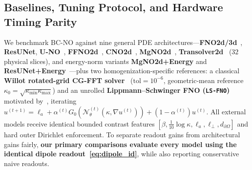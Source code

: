 \documentclass[preprint,11pt]{elsarticle}
\begin{document}
\subsection{Baselines, Tuning Protocol, and Hardware Timing Parity}
We benchmark BC-NO against nine general PDE architectures—\textbf{FNO2d/3d}~\cite{li2021fno}, \textbf{ResUNet}, \textbf{U-NO}~\cite{rahman2023uno}, \textbf{FFNO2d}~\cite{tran2023ffno}, \textbf{CNO2d}~\cite{raonic2023cno}, \textbf{MgNO2d}~\cite{he2024mgno}, \textbf{Transolver2d}~\cite{wu2024transolver} ($32$ physical slices), and energy-norm variants \textbf{MgNO2d+Energy} and \textbf{ResUNet+Energy}~\cite{xing2025cgins}—plus two homogenization-specific references: a classical \textbf{Willot rotated-grid CG-FFT solver}~\cite{willot2015fourier,zeman2010accelerating} ($\mathrm{tol}=10^{-6}$, geometric-mean reference $\kappa_0 = \sqrt{\kappa_{\min}\kappa_{\max}}$) and an unrolled \textbf{Lippmann--Schwinger FNO (\texttt{LS-FNO})} motivated by~\cite{nguyen2026ufno}, iterating $u^{(t+1)} = \ell_a + \alpha^{(t)} G_0(\mathcal{N}_\theta^{(t)}(\kappa, \nabla u^{(t)})) + (1-\alpha^{(t)}) u^{(t)}$. All external models receive identical bounded contrast features $[\beta, \tfrac{1}{10}\log\kappa, \ell_a, \ell_\perp, d_{\partial\Omega}]$ and hard outer Dirichlet enforcement. To separate readout gains from architectural gains fairly, \textbf{our primary comparisons evaluate every model using the identical dipole readout~\eqref{eq:dipole_id}}, while also reporting conservative naive readouts.
\end{document}
